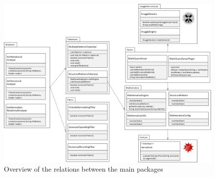 \begin{figure}[h!]
	\centering
	\includegraphics[height=10.5 cm]{visio_drawings/main_packages.png}
	\caption{Overview of the relations between the main packages}
	\label{uml_filters}
\end{figure}
